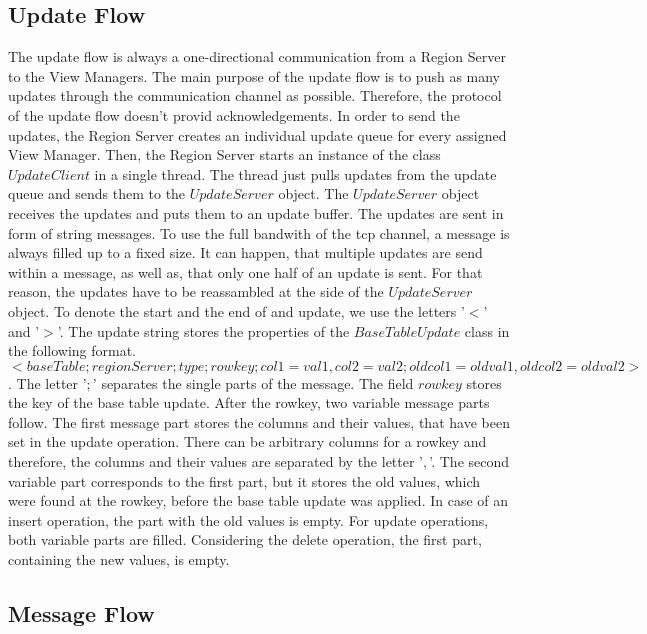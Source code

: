 \documentclass[11pt,a4paper,bibtotoc,idxtotoc,headsepline,footsepline,footexclude,BCOR12mm,DIV13]{scrbook}
\begin{document}
\subsection{Update Flow}
The update flow is always a one-directional communication from a Region Server to the View Managers. The main purpose of the update flow is to push as many updates through the communication channel as possible. Therefore, the protocol of the update flow doesn't provid acknowledgements. In order to send the updates, the Region Server creates an individual update queue for every assigned View Manager. Then, the Region Server starts an instance of the class $UpdateClient$ in a single thread. The thread just pulls updates from the update queue and sends them to the $UpdateServer$ object. The $UpdateServer$ object receives the updates and puts them to an update buffer. The updates are sent in form of string messages. To use the full bandwith of the tcp channel, a message is always filled up to a fixed size. It can happen, that multiple updates are send within a message, as well as, that only one half of an update is sent. For that reason, the updates have to be reassambled at the side of the $UpdateServer$  object. To denote the start and the end of and update, we use the letters '$<$' and '$>$'. The update string stores the properties of the $BaseTableUpdate$ class in the following format. $<baseTable;regionServer;type;rowkey;col1=val1,col2=val2;oldcol1=oldval1,oldcol2=oldval2>$. The letter '$;$' separates the single parts of the message. The field $rowkey$ stores the key of the base table update. After the rowkey, two variable message parts follow. The first message part stores the columns and their values, that have been set in the update operation. There can be arbitrary columns for a rowkey and therefore, the columns and their values are separated by the letter '$,$'. The second variable part corresponds to the first part, but it stores the old values, which were found at the rowkey, before the base table update was applied. In case of an insert operation, the part with the old values is empty. For update operations, both variable parts are filled. Considering the delete operation, the first part, containing the new values, is empty.

\subsection{Message Flow}
\end{document}

